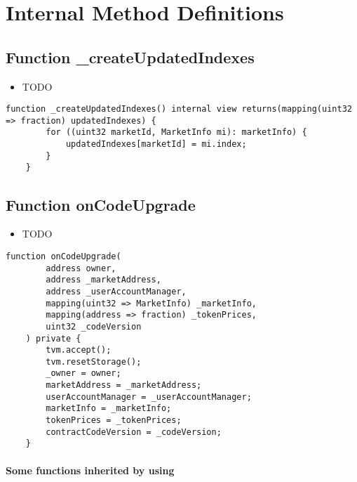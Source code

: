 \section{Internal Method Definitions}


\subsection{Function \_{}createUpdatedIndexes}

\noindent\begin{itemize}
\item TODO
\end{itemize}

\begin{lstlisting}[firstnumber=99]
    function _createUpdatedIndexes() internal view returns(mapping(uint32 => fraction) updatedIndexes) {
        for ((uint32 marketId, MarketInfo mi): marketInfo) {
            updatedIndexes[marketId] = mi.index;
        }
    }
\end{lstlisting}

\subsection{Function onCodeUpgrade}

\noindent\begin{itemize}
\item TODO
\end{itemize}

\begin{lstlisting}[firstnumber=39]
    function onCodeUpgrade(
        address owner,
        address _marketAddress,
        address _userAccountManager,
        mapping(uint32 => MarketInfo) _marketInfo,
        mapping(address => fraction) _tokenPrices,
        uint32 _codeVersion
    ) private {
        tvm.accept();
        tvm.resetStorage();
        _owner = owner;
        marketAddress = _marketAddress;
        userAccountManager = _userAccountManager;
        marketInfo = _marketInfo;
        tokenPrices = _tokenPrices;
        contractCodeVersion = _codeVersion;
    }
\end{lstlisting}
\paragraph{Some functions inherited by using}

